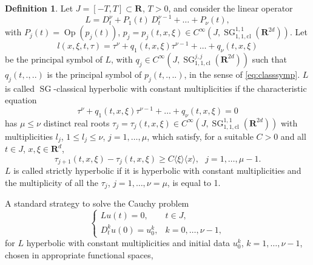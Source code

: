 \documentclass[12pt,a4paper,reqno]{amsart}
\numberwithin{equation}{section}
\numberwithin{thm}{section}
\theoremstyle{definition}
\newtheorem{defn}[thm]{Definition}
\theoremstyle{remark}
\begin{document}
\begin{defn}
    \label{def:4.13}
    Let $J=[-T,T] \subset {\mathbf R^{{}}}$, $T > 0$, and consider the linear operator
        \begin{equation}
	\label{eq:4bis.69}
	L = D_{t}^\nu + P_{1}(t)\,D_{t}^{\nu-1} + \dots + P_{\nu}(t),
    \end{equation}
        with $P_j(t)={\operatorname{Op}({p_j(t)})}$,
    $p_{j} = p_{j}(t,x,\xi) \in C^\infty(J,{\operatorname{SG}}^{1,1}_{1,1,\mathrm{cl}}({\mathbf R^{{2d}}}))$. Let
        \[
    l(x,\xi,t,\tau) = \tau^\nu + q_{1}(t,x,\xi)\tau^{\nu-1} + \dots + q_{\nu}(t,x,\xi)
	\]
		 be the principal symbol of $L$, with
	$q_{j} \in C^\infty(J,{\operatorname{SG}}^{j,j}_{1,1,\mathrm{cl}}({\mathbf R^{{2d}}}))$
	such that $q_{j}(t,.,..)$ is the principal symbol of $p_j(t,.,..)$, in the sense of
		 \eqref{eq:classsymp}.
        $L$ is called ${\operatorname{SG}}$-classical hyperbolic with constant multiplicities if
    the characteristic equation
        \begin{equation}
	\label{eq:4bis.73}
	\tau^\nu + q_{1}(t,x,\xi)\tau^{\nu-1} + \dots + q_{\nu}(t,x,\xi) = 0
    \end{equation}
        has $\mu \le \nu$ distinct real roots $\tau_{j} = \tau_{j}(t,x,\xi)
    \in C^\infty(J,{\operatorname{SG}}^{1,1}_{1,1,\mathrm{cl}}({\mathbf R^{{2d}}}))$ with multiplicities $l_{j}$, $1\le l_j\le \nu$,
    $j=1,\dots,\mu$, which satisfy, for a suitable $C > 0$ and all $t\in J$, $x,\xi\in{\mathbf R^{{d}}}$,
        \begin{equation}
	\label{eq:4bis.2}
        \tau_{j+1}(t,x,\xi) - \tau_{j}(t,x,\xi) \ge
	C {\langle{\xi}\rangle} {\langle{x}\rangle}, \mbox{  } j = 1, \dots, \mu - 1.
    \end{equation}
        $L$ is called strictly hyperbolic if it is hyperbolic with constant
    multiplicities and the multiplicity of all the $\tau_{j}$, $j=1,\dots,\nu=\mu$, is equal to 1.
\end{defn}
A standard strategy to solve the Cauchy problem
\begin{equation}
    \label{eq:4bis.74}
    \left\{
     \begin{array}{ll}
	 L u(t) = 0,          & t \in J,
	 \\
	 D_{t}^k u(0) = u^k_{0},     & k=0,\dots,\nu-1,
     \end{array}
    \right.
\end{equation}
for $L$ hyperbolic with constant multiplicities
and initial data $u_{0}^k$, $k=1,\dots,\nu-1$, chosen in appropriate functional spaces,
\end{document}
